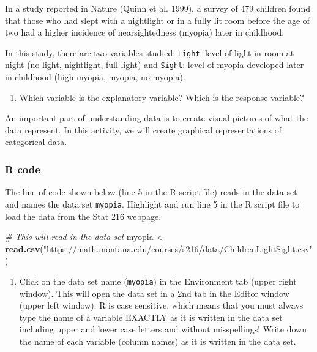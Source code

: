 \documentclass[
]{report}
\newenvironment{Shaded}{\begin{snugshade}}{\end{snugshade}}
\newcommand{\CommentTok}[1]{\textcolor[rgb]{0.56,0.35,0.01}{\textit{#1}}}
\newcommand{\FunctionTok}[1]{\textcolor[rgb]{0.13,0.29,0.53}{\textbf{#1}}}
\newcommand{\NormalTok}[1]{#1}
\newcommand{\OtherTok}[1]{\textcolor[rgb]{0.56,0.35,0.01}{#1}}
\newcommand{\StringTok}[1]{\textcolor[rgb]{0.31,0.60,0.02}{#1}}
\providecommand{\tightlist}{%
  \setlength{\itemsep}{0pt}\setlength{\parskip}{0pt}}
\begin{document}
In a study reported in Nature (Quinn et al. 1999), a survey of 479 children found that those who had slept with a nightlight or in a fully lit room before the age of two had a higher incidence of nearsightedness (myopia) later in childhood.

In this study, there are two variables studied: \texttt{Light}: level of light in room at night (no light, nightlight, full light) and \texttt{Sight}: level of myopia developed later in childhood (high myopia, myopia, no myopia).

\begin{enumerate}
\def\labelenumi{\arabic{enumi}.}
\tightlist
\item
  Which variable is the explanatory variable? Which is the response variable?
\end{enumerate}

\vspace{0.8in}

An important part of understanding data is to create visual pictures of what the data represent. In this activity, we will create graphical representations of categorical data.

\subsubsection*{R code}\label{r-code-1}

The line of code shown below (line 5 in the R script file) reads in the data set and names the data set \texttt{myopia}. Highlight and run line 5 in the R script file to load the data from the Stat 216 webpage.

\begin{Shaded}
\begin{Highlighting}[]
\CommentTok{\# This will read in the data set}
\NormalTok{myopia }\OtherTok{\textless{}{-}} \FunctionTok{read.csv}\NormalTok{(}\StringTok{"https://math.montana.edu/courses/s216/data/ChildrenLightSight.csv"}\NormalTok{) }
\end{Highlighting}
\end{Shaded}

\begin{enumerate}
\def\labelenumi{\arabic{enumi}.}
\setcounter{enumi}{1}
\tightlist
\item
  Click on the data set name (\texttt{myopia}) in the Environment tab (upper right window). This will open the data set in a 2nd tab in the Editor window (upper left window). R is case sensitive, which means that you must always type the name of a variable EXACTLY as it is written in the data set including upper and lower case letters and without misspellings! Write down the name of each variable (column names) as it is written in the data set.
\end{enumerate}
\end{document}
